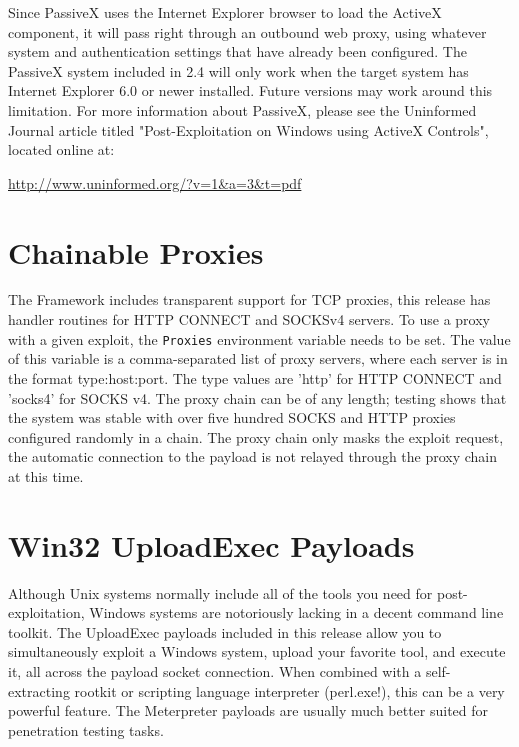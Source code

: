 \documentclass{report}
\begin{document}
\par
Since PassiveX uses the Internet Explorer browser to load the ActiveX
component, it will pass right through an outbound web proxy, using whatever
system and authentication settings that have already been configured. The
PassiveX system included in 2.4 will only work when the target system has
Internet Explorer 6.0 or newer installed. Future versions may work around this
limitation. For more information about PassiveX, please see the Uninformed
Journal article titled "Post-Exploitation on Windows using ActiveX Controls",
located online at:

\url{http://www.uninformed.org/?v=1&a=3&t=pdf}

\section{Chainable Proxies}
\par
The Framework includes transparent support for TCP proxies, this release has
handler routines for HTTP CONNECT and SOCKSv4 servers. To use a proxy with a
given exploit, the \texttt{Proxies} environment variable needs to be set. The value of
this variable is a comma-separated list of proxy servers, where each server is
in the format type:host:port. The type values are 'http' for HTTP CONNECT and
'socks4' for SOCKS v4. The proxy chain can be of any length; testing shows that
the system was stable with over five hundred SOCKS and HTTP proxies configured
randomly in a chain. The proxy chain only masks the exploit request, the
automatic connection to the payload is not relayed through the proxy chain at
this time. 

\section{Win32 UploadExec Payloads}
\par
Although Unix systems normally include all of the tools you need for
post-exploitation, Windows systems are notoriously lacking in a decent command
line toolkit. The UploadExec payloads included in this release allow you to
simultaneously exploit a Windows system, upload your favorite tool, and execute
it, all across the payload socket connection. When combined with a
self-extracting rootkit or scripting language interpreter (perl.exe!), this can
be a very powerful feature. The Meterpreter payloads are usually much better
suited for penetration testing tasks.  
\end{document}
